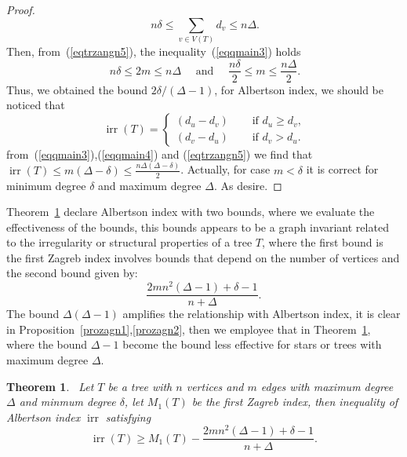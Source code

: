 \documentclass[12pt]{amsart}
\newcommand{\irr}{\operatorname{irr}}
\newtheorem{theorem}{Theorem}[section]
\begin{document}
\begin{proof}
\begin{equation}~\label{eqqmain3}
 n \delta \leq \sum_{v \in V(T)} d_v \leq n \Delta.
\end{equation}
Then, from~(\ref{eqtrzangn5}), the inequality~(\ref{eqqmain3}) holds 
\begin{equation}~\label{eqqmain4}
n \delta \leq 2 m \leq n \Delta \quad \text{ and }\quad
\frac{n \delta}{2} \leq m \leq \frac{n \Delta}{2}. 
\end{equation}
Thus, we obtained the bound $2\delta/(\Delta - 1)$, for Albertson index, we should be noticed that
\begin{equation}~\label{eqqmain5}
\irr(T)=\begin{cases}
    (d_u - d_v) \quad & \text{ if } d_u \geq d_v,\\
     (d_v - d_u) \quad & \text{ if } d_v > d_u.
\end{cases}
\end{equation}
from~(\ref{eqqmain3}),(\ref{eqqmain4}) and (\ref{eqtrzangn5}) we find that $\irr(T) \leq m (\Delta - \delta) \leq \frac{n \Delta (\Delta - \delta)}{2}$. Actually, for case $m<\delta$ it is correct for  minimum degree $\delta$  and maximum degree $\Delta$. As desire.
\end{proof}
Theorem~\ref{thmalbn1} declare Albertson index with two bounds,  where we evaluate the effectiveness of the bounds, this bounds appears to be a graph invariant related to the irregularity or structural properties of a tree $T$, where the first bound is the first Zagreb index  involves bounds that depend on the number of vertices and the second bound given by: 
\[
\frac{2mn^2(\Delta - 1)+\delta-1}{n+\Delta}.
\]
The bound $\Delta(\Delta-1)$  amplifies the relationship with Albertson index, it is clear in Proposition~\ref{prozagn1},\ref{prozagn2}, then we employee that in Theorem~\ref{thmalbn1}, where the bound $\Delta-1$ become the bound less effective for stars or trees with maximum degree $\Delta$.
\begin{theorem}~\label{thmalbn1}
Let $T$ be a tree with $n$ vertices and $m$ edges with maximum degree $\Delta$ and minmum  degree $\delta$, let $M_1(T)$ be the first Zagreb index, then inequality of Albertson index $\irr$ satisfying 
\[
\irr(T) \geq M_1(T)  - \frac{2mn^2(\Delta - 1)+\delta-1}{n+\Delta}.
\]
\end{theorem}
\end{document}
